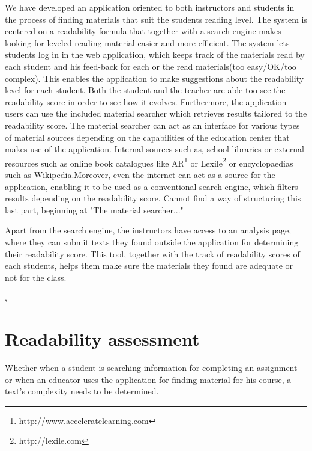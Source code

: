 \documentclass{sig-alternate-05-2015}
\begin{document}
We have developed an application oriented to both instructors and students in the process of finding materials that suit the students reading level. The system is centered on a readability formula that together with a search engine makes looking for leveled reading material easier and more efficient. The system lets students log in in the web application, which keeps track of the materials read by each student and his feed-back for each or the read materials(too easy/OK/too complex). This enables the application to make suggestions about the readability level for each student. Both the student and the teacher are able too see the readability score in order to see how it evolves. Furthermore, the application users can use the included material searcher which retrieves results tailored to the readability score. The material searcher can act as an interface for various types of material sources depending on the capabilities of the education center that makes use of the application. Internal sources such as, school libraries or external resources such as online book catalogues like AR\footnote{http://www.acceleratelearning.com} or Lexile\footnote{http://lexile.com} or encyclopaedias such as Wikipedia.Moreover, even the internet can act as a source for the application, enabling it to be used as a conventional search engine, which filters results depending on the readability score. {\color{red} Cannot find a way of structuring this last part, beginning at "The material searcher..."}





Apart from the search engine, the instructors have access to an analysis page, where they can submit texts they found outside the application for determining their readability score. This tool, together with the track of readability scores of each students, helps them make sure the materials they found are adequate or not for the class.

,


\section{Readability assessment}
Whether when a student is searching information for completing an assignment or when an educator uses the application for finding material for his course, a text's complexity needs to be determined.\\

\end{document}
